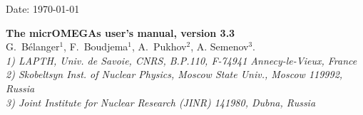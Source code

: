 \documentclass[12pt,a4paper]{article}
\begin{document}
\def\micro{{\tt micrOMEGAs}}
\def\ra{\rightarrow}
\def\calchep{{\tt CalcHEP}}

\def\suspect{{\tt SuSpect}}
\def\mbmb{m_b(m_b)}
\def\mt{m_t}
\def\dMb{\Delta m_b}
\def\dMq{\Delta m_q}
\def\delrho{\Delta\rho}
\def\bsgamma{b\to s\gamma}
\def\bsmu{B_s\to \mu^+\mu^-}
\def\gmuon{(g-2)_\mu}
\def\noi{\noindent}
\def\VERSION{3.X}


\begin{flushright}
   \vspace*{-18mm}
   Date: \today
\end{flushright}
\vspace*{2mm}




\begin{center}


{\Large\bf The  micrOMEGAs user's manual, version 3.3} \\[8mm]

{\large   G.~B\'elanger$^1$, F.~Boudjema$^1$, A.~Pukhov$^2$,  A. Semenov$^3$.}\\[4mm]

{\it 1) LAPTH, Univ. de Savoie, CNRS, B.P.110,  F-74941 Annecy-le-Vieux, France\\
     2) Skobeltsyn Inst. of Nuclear Physics, Moscow State Univ., Moscow 119992, Russia\\
     3) Joint Institute for Nuclear Research (JINR) 141980, Dubna,  Russia\\}
\end{center}

\begin{abstract}
We give an up-to-date description of the micrOMEGAs functions. Only the routines which are available for
the users are described.  Examples on how to use these functions
can be found in the sample main programs distributed with the code. 
\end{abstract}



\tableofcontents

\newpage
\end{document}

